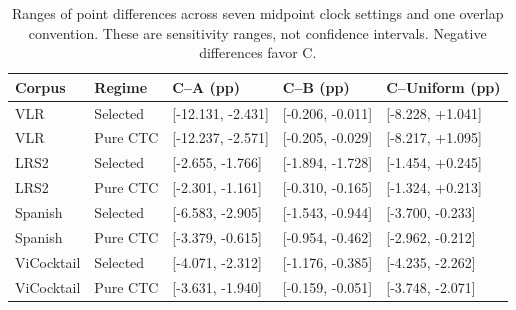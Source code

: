 \begin{table}[tb]
\centering\small
\caption{Ranges of point differences across seven midpoint clock settings and one overlap convention. These are sensitivity ranges, not confidence intervals. Negative differences favor C.}
\label{tab:timing-range}
\begin{tabular}{lllll}
\toprule
Corpus & Regime & C--A (pp) & C--B (pp) & C--Uniform (pp) \\
\midrule
VLR & Selected & [-12.131, -2.431] & [-0.206, -0.011] & [-8.228, +1.041] \\
VLR & Pure CTC & [-12.237, -2.571] & [-0.205, -0.029] & [-8.217, +1.095] \\
LRS2 & Selected & [-2.655, -1.766] & [-1.894, -1.728] & [-1.454, +0.245] \\
LRS2 & Pure CTC & [-2.301, -1.161] & [-0.310, -0.165] & [-1.324, +0.213] \\
Spanish & Selected & [-6.583, -2.905] & [-1.543, -0.944] & [-3.700, -0.233] \\
Spanish & Pure CTC & [-3.379, -0.615] & [-0.954, -0.462] & [-2.962, -0.212] \\
ViCocktail & Selected & [-4.071, -2.312] & [-1.176, -0.385] & [-4.235, -2.262] \\
ViCocktail & Pure CTC & [-3.631, -1.940] & [-0.159, -0.051] & [-3.748, -2.071] \\
\bottomrule
\end{tabular}
\end{table}
